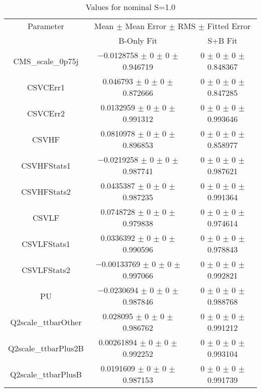 \begin{table}
\centering
\caption{Values for nominal S=1.0}
\begin{tabular}{ccc}
\toprule
Parameter & \multicolumn{2}{c}{Mean $\pm$ Mean Error $\pm$ RMS $\pm$ Fitted Error}\\
 & B-Only Fit & S+B Fit\\
\midrule
CMS\_scale\_0p75j & \num{-0.0128758} $\pm$ \num{0} $\pm$ \num{0} $\pm$ \num{0.946719} & \num{0} $\pm$ \num{0} $\pm$ \num{0} $\pm$ \num{0.848367}\\
CSVCErr1 & \num{0.046793} $\pm$ \num{0} $\pm$ \num{0} $\pm$ \num{0.872666} & \num{0} $\pm$ \num{0} $\pm$ \num{0} $\pm$ \num{0.847285}\\
CSVCErr2 & \num{0.0132959} $\pm$ \num{0} $\pm$ \num{0} $\pm$ \num{0.991312} & \num{0} $\pm$ \num{0} $\pm$ \num{0} $\pm$ \num{0.993646}\\
CSVHF & \num{0.0810978} $\pm$ \num{0} $\pm$ \num{0} $\pm$ \num{0.896853} & \num{0} $\pm$ \num{0} $\pm$ \num{0} $\pm$ \num{0.858977}\\
CSVHFStats1 & \num{-0.0219258} $\pm$ \num{0} $\pm$ \num{0} $\pm$ \num{0.987741} & \num{0} $\pm$ \num{0} $\pm$ \num{0} $\pm$ \num{0.987621}\\
CSVHFStats2 & \num{0.0435387} $\pm$ \num{0} $\pm$ \num{0} $\pm$ \num{0.987235} & \num{0} $\pm$ \num{0} $\pm$ \num{0} $\pm$ \num{0.991364}\\
CSVLF & \num{0.0748728} $\pm$ \num{0} $\pm$ \num{0} $\pm$ \num{0.979838} & \num{0} $\pm$ \num{0} $\pm$ \num{0} $\pm$ \num{0.974614}\\
CSVLFStats1 & \num{0.0336392} $\pm$ \num{0} $\pm$ \num{0} $\pm$ \num{0.990596} & \num{0} $\pm$ \num{0} $\pm$ \num{0} $\pm$ \num{0.978843}\\
CSVLFStats2 & \num{-0.00133769} $\pm$ \num{0} $\pm$ \num{0} $\pm$ \num{0.997066} & \num{0} $\pm$ \num{0} $\pm$ \num{0} $\pm$ \num{0.992821}\\
PU & \num{-0.0230694} $\pm$ \num{0} $\pm$ \num{0} $\pm$ \num{0.987846} & \num{0} $\pm$ \num{0} $\pm$ \num{0} $\pm$ \num{0.988768}\\
Q2scale\_ttbarOther & \num{0.028095} $\pm$ \num{0} $\pm$ \num{0} $\pm$ \num{0.986762} & \num{0} $\pm$ \num{0} $\pm$ \num{0} $\pm$ \num{0.991212}\\
Q2scale\_ttbarPlus2B & \num{0.00261894} $\pm$ \num{0} $\pm$ \num{0} $\pm$ \num{0.992252} & \num{0} $\pm$ \num{0} $\pm$ \num{0} $\pm$ \num{0.993104}\\
Q2scale\_ttbarPlusB & \num{0.0191609} $\pm$ \num{0} $\pm$ \num{0} $\pm$ \num{0.987153} & \num{0} $\pm$ \num{0} $\pm$ \num{0} $\pm$ \num{0.991739}\\

\end{tabular}
\end{table}
